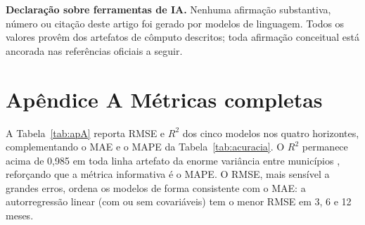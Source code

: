 \documentclass[12pt,a4paper,oneside]{article}
\begin{document}
\bigskip
\noindent\textbf{Declaração sobre ferramentas de IA.} Nenhuma afirmação
substantiva, número ou citação deste artigo foi gerado por modelos de
linguagem. Todos os valores provêm dos artefatos de cômputo descritos;
toda afirmação conceitual está ancorada nas referências oficiais a seguir.

\newpage
\section*{Apêndice A \textendash{} Métricas completas}

A Tabela~\ref{tab:apA} reporta RMSE e $R^2$ dos cinco modelos nos quatro
horizontes, complementando o MAE e o MAPE da Tabela~\ref{tab:acuracia}. O
$R^2$ permanece acima de 0,985 em toda linha \textemdash{} artefato da
enorme variância entre municípios \textemdash{}, reforçando que a métrica
informativa é o MAPE. O RMSE, mais sensível a grandes erros, ordena os
modelos de forma consistente com o MAE: a autorregressão linear (com ou
sem covariáveis) tem o menor RMSE em 3, 6 e 12 meses.
\end{document}
